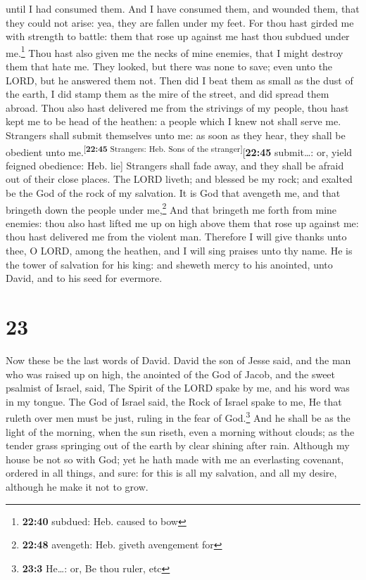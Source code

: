 until I had consumed them.  And I have consumed them, and
wounded them, that they could not arise: yea, they are fallen under my
feet.  For thou hast girded me with strength to battle:
them that rose up against me hast thou subdued under me.\footnote{\textbf{22:40}
  subdued: Heb. caused to bow}  Thou hast also given me
the necks of mine enemies, that I might destroy them that hate me.
 They looked, but there was none to save; even unto the
LORD, but he answered them not.  Then did I beat them as
small as the dust of the earth, I did stamp them as the mire of the
street, and did spread them abroad.  Thou also hast
delivered me from the strivings of my people, thou hast kept me to be
head of the heathen: a people which I knew not shall serve me.
 Strangers shall submit themselves unto me: as soon as
they hear, they shall be obedient unto
me.\textsuperscript{{[}\textbf{22:45} Strangers: Heb. Sons of the
stranger{]}}{[}\textbf{22:45} submit\ldots: or, yield feigned obedience:
Heb. lie{]}  Strangers shall fade away, and they shall be
afraid out of their close places.  The LORD liveth; and
blessed be my rock; and exalted be the God of the rock of my salvation.
 It is God that avengeth me, and that bringeth down the
people under me,\footnote{\textbf{22:48} avengeth: Heb. giveth
  avengement for}  And that bringeth me forth from mine
enemies: thou also hast lifted me up on high above them that rose up
against me: thou hast delivered me from the violent man. 
Therefore I will give thanks unto thee, O LORD, among the heathen, and I
will sing praises unto thy name.  He is the tower of
salvation for his king: and sheweth mercy to his anointed, unto David,
and to his seed for evermore.

\hypertarget{section-22}{%
\section{23}\label{section-22}}

 Now these be the last words of David. David the son of
Jesse said, and the man who was raised up on high, the anointed of the
God of Jacob, and the sweet psalmist of Israel, said,  The
Spirit of the LORD spake by me, and his word was in my tongue.
 The God of Israel said, the Rock of Israel spake to me,
He that ruleth over men must be just, ruling in the fear of
God.\footnote{\textbf{23:3} He\ldots: or, Be thou ruler, etc}
 And he shall be as the light of the morning, when the sun
riseth, even a morning without clouds; as the tender grass springing out
of the earth by clear shining after rain.  Although my
house be not so with God; yet he hath made with me an everlasting
covenant, ordered in all things, and sure: for this is all my salvation,
and all my desire, although he make it not to grow.

